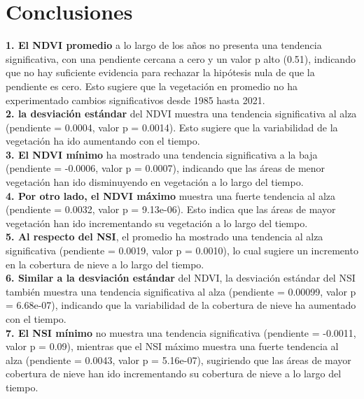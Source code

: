 \maketitle
\section{Conclusiones}
{\small
\textbf{1.	El NDVI promedio} a lo largo de los años no presenta una tendencia significativa, con una pendiente cercana a cero y un valor p alto (0.51), indicando que no hay suficiente evidencia para rechazar la hipótesis nula de que la pendiente es cero. Esto sugiere que la vegetación en promedio no ha experimentado cambios significativos desde 1985 hasta 2021.\\

\textbf{2. la desviación estándar} del NDVI muestra una tendencia significativa al alza (pendiente = 0.0004, valor p = 0.0014). Esto sugiere que la variabilidad de la vegetación ha ido aumentando con el tiempo.\\

\textbf{3.	El NDVI mínimo} ha mostrado una tendencia significativa a la baja (pendiente = -0.0006, valor p = 0.0007), indicando que las áreas de menor vegetación han ido disminuyendo en vegetación a lo largo del tiempo.\\

\textbf{4.	Por otro lado, el NDVI máximo} muestra una fuerte tendencia al alza (pendiente = 0.0032, valor p = 9.13e-06). Esto indica que las áreas de mayor vegetación han ido incrementando su vegetación a lo largo del tiempo.\\

\textbf{5.	Al respecto del NSI}, el promedio ha mostrado una tendencia al alza significativa (pendiente = 0.0019, valor p = 0.0010), lo cual sugiere un incremento en la cobertura de nieve a lo largo del tiempo.\\

\textbf{6.	Similar a la desviación estándar} del NDVI, la desviación estándar del NSI también muestra una tendencia significativa al alza (pendiente = 0.00099, valor p = 6.68e-07), indicando que la variabilidad de la cobertura de nieve ha aumentado con el tiempo.\\

\textbf{7.	El NSI mínimo} no muestra una tendencia significativa (pendiente = -0.0011, valor p = 0.09), mientras que el NSI máximo muestra una fuerte tendencia al alza (pendiente = 0.0043, valor p = 5.16e-07), sugiriendo que las áreas de mayor cobertura de nieve han ido incrementando su cobertura de nieve a lo largo del tiempo.\\

}
